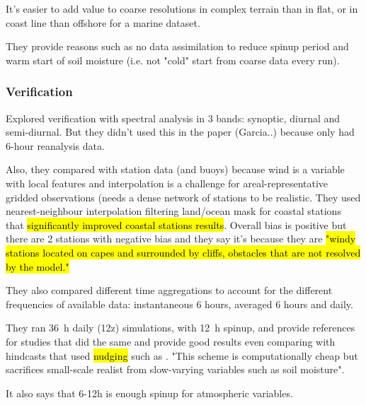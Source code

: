 \documentclass[12pt,a4paper]{article}
\begin{document}
It's easier to add value to coarse resolutions in complex terrain than in flat, or in coast line than offshore for a marine dataset. 

They provide reasons such as no data assimilation to reduce spinup period and warm start of soil moisture (i.e. not "cold" start from coarse data every run).

\subsubsection{Verification}

Explored verification with spectral analysis in 3 bands: synoptic, diurnal and semi-diurnal. But they didn't used this in the paper (Garcia..) because only had 6-hour reanalysis data.

Also, they compared with station data (and buoys) because wind is a variable with local features and interpolation is a challenge for areal-representative gridded observations (needs a dense network of stations to be realistic. They used nearest-neighbour interpolation filtering land/ocean mask for coastal stations that \hl{significantly improved coastal stations results}. Overall bias is positive but there are 2 stations with negative bias and they say it's because they are \hl{"windy stations located on capes and surrounded by cliffs, obstacles that are not resolved by the model."}

They also compared different time aggregations to account for the different frequencies of available data: instantaneous 6 hours, averaged 6 hours and daily.

They ran 36~h daily (12z) simulations, with 12~h spinup, and provide references for studies that did the same and provide good results even comparing with hindcasts that used \hl{nudging} such as \cite{Menendez2014a}. "This scheme is computationally cheap but sacrifices small-scale realist from slow-varying variables such as soil moisture".  

It also says that 6-12h is enough spinup for atmospheric variables.

\subsection{\cite{Vincent2015}}
\end{document}
